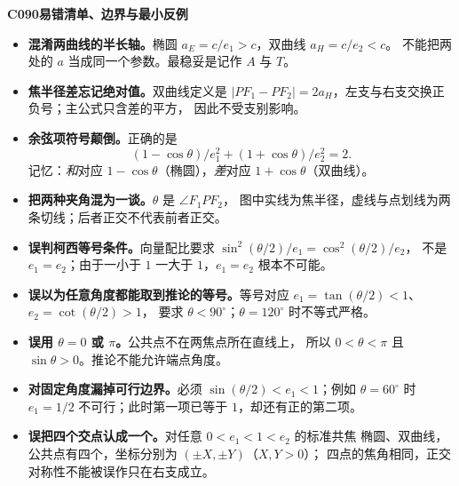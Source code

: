 \clearpage
\begin{trapbox}
\textbf{C090\quad 易错清单、边界与最小反例}

\begin{center}

\end{center}
\begin{itemize}
\item \textbf{混淆两曲线的半长轴。}椭圆 $a_E=c/e_1>c$，双曲线 $a_H=c/e_2<c$。
不能把两处的 $a$ 当成同一个参数。最稳妥是记作 $A$ 与 $T$。

\item \textbf{焦半径差忘记绝对值。}双曲线定义是
$|PF_1-PF_2|=2a_H$，左支与右支交换正负号；主公式只含差的平方，
因此不受支别影响。

\item \textbf{余弦项符号颠倒。}正确的是
\[
 \boxed{(1-\cos\theta)/e_1^2+(1+\cos\theta)/e_2^2=2}.
\]
记忆：\emph{和}对应 $1-\cos\theta$（椭圆），\emph{差}对应 $1+\cos\theta$（双曲线）。

\item \textbf{把两种夹角混为一谈。}$\theta$ 是 $\angle F_1PF_2$，
图中实线为焦半径，虚线与点划线为两条切线；后者正交不代表前者正交。

\item \textbf{误判柯西等号条件。}向量配比要求
$\sin^2(\theta/2)/e_1=\cos^2(\theta/2)/e_2$，
不是 $e_1=e_2$；由于一小于 $1$ 一大于 $1$，$e_1=e_2$ 根本不可能。

\item \textbf{误以为任意角度都能取到推论的等号。}等号对应
$e_1=\tan(\theta/2)<1$、$e_2=\cot(\theta/2)>1$，
要求 $\theta<90^\circ$；$\theta=120^\circ$ 时不等式严格。

\item \textbf{误用 $\theta=0$ 或 $\pi$。}公共点不在两焦点所在直线上，
所以 $0<\theta<\pi$ 且 $\sin\theta>0$。推论不能允许端点角度。

\item \textbf{对固定角度漏掉可行边界。}必须
$\sin(\theta/2)<e_1<1$；例如 $\theta=60^\circ$ 时
$e_1=1/2$ 不可行；此时第一项已等于 $1$，却还有正的第二项。

\item \textbf{误把四个交点认成一个。}对任意 $0<e_1<1<e_2$ 的标准共焦
椭圆、双曲线，公共点有四个，坐标分别为 $(\pm X,\pm Y)$（$X,Y>0$）；
四点的焦角相同，正交对称性不能被误作只在右支成立。
\end{itemize}
\end{trapbox}

